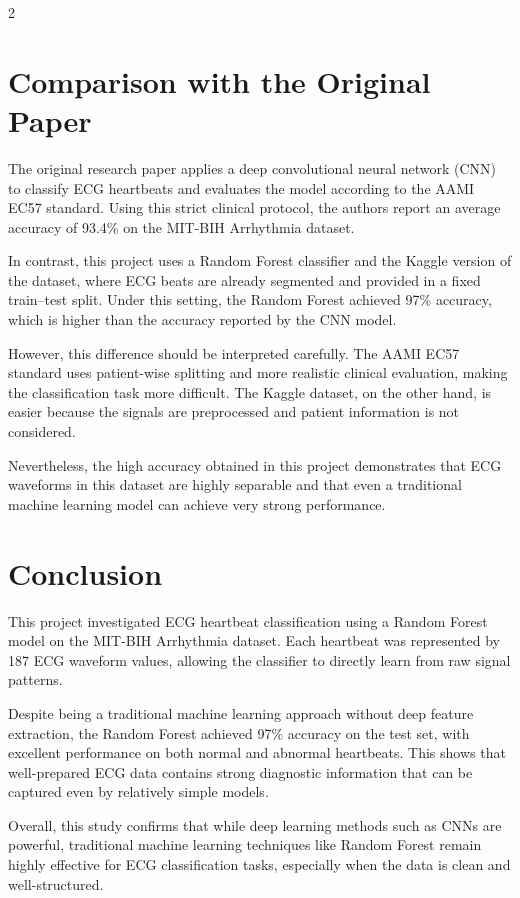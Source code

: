 \documentclass[a4paper,10pt]{article}
\begin{document}
\begin{multicols}{2}
\section{Comparison with the Original Paper}

The original research paper applies a deep convolutional neural network (CNN) to classify ECG heartbeats and evaluates the model according to the AAMI EC57 standard. Using this strict clinical protocol, the authors report an average accuracy of 93.4\% on the MIT-BIH Arrhythmia dataset.

In contrast, this project uses a Random Forest classifier and the Kaggle version of the dataset, where ECG beats are already segmented and provided in a fixed train--test split. Under this setting, the Random Forest achieved 97\% accuracy, which is higher than the accuracy reported by the CNN model.

However, this difference should be interpreted carefully. The AAMI EC57 standard uses patient-wise splitting and more realistic clinical evaluation, making the classification task more difficult. The Kaggle dataset, on the other hand, is easier because the signals are preprocessed and patient information is not considered.

Nevertheless, the high accuracy obtained in this project demonstrates that ECG waveforms in this dataset are highly separable and that even a traditional machine learning model can achieve very strong performance.

\section{Conclusion}

This project investigated ECG heartbeat classification using a Random Forest model on the MIT-BIH Arrhythmia dataset. Each heartbeat was represented by 187 ECG waveform values, allowing the classifier to directly learn from raw signal patterns.

Despite being a traditional machine learning approach without deep feature extraction, the Random Forest achieved 97\% accuracy on the test set, with excellent performance on both normal and abnormal heartbeats. This shows that well-prepared ECG data contains strong diagnostic information that can be captured even by relatively simple models.

Overall, this study confirms that while deep learning methods such as CNNs are powerful, traditional machine learning techniques like Random Forest remain highly effective for ECG classification tasks, especially when the data is clean and well-structured.

\end{multicols}
\end{document}
